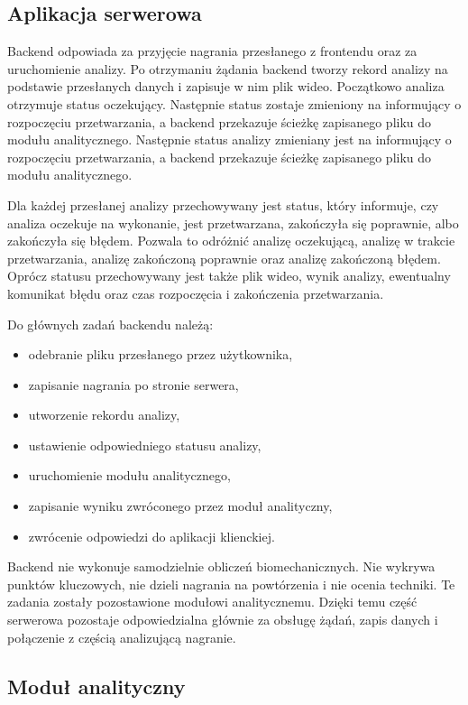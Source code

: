 \subsection{Aplikacja serwerowa}

Backend odpowiada za przyjęcie nagrania przesłanego z frontendu oraz za uruchomienie analizy. Po otrzymaniu żądania backend tworzy rekord analizy na podstawie przesłanych danych i zapisuje w nim plik wideo. Początkowo analiza otrzymuje status oczekujący. Następnie status zostaje zmieniony na informujący o rozpoczęciu przetwarzania, a backend przekazuje ścieżkę zapisanego pliku do modułu analitycznego. Następnie status analizy zmieniany jest na informujący o rozpoczęciu przetwarzania, a backend przekazuje ścieżkę zapisanego pliku do modułu analitycznego.

Dla każdej przesłanej analizy przechowywany jest status, który informuje, czy analiza oczekuje na wykonanie, jest przetwarzana, zakończyła się poprawnie, albo zakończyła się błędem. Pozwala to odróżnić analizę oczekującą, analizę w trakcie przetwarzania, analizę zakończoną poprawnie oraz analizę zakończoną błędem. Oprócz statusu przechowywany jest także plik wideo, wynik analizy, ewentualny komunikat błędu oraz czas rozpoczęcia i zakończenia przetwarzania.

Do głównych zadań backendu należą:

\begin{itemize}
\item odebranie pliku przesłanego przez użytkownika,
\item zapisanie nagrania po stronie serwera,
\item utworzenie rekordu analizy,
\item ustawienie odpowiedniego statusu analizy,
\item uruchomienie modułu analitycznego,
\item zapisanie wyniku zwróconego przez moduł analityczny,
\item zwrócenie odpowiedzi do aplikacji klienckiej.
\end{itemize}

Backend nie wykonuje samodzielnie obliczeń biomechanicznych. Nie wykrywa punktów kluczowych, nie dzieli nagrania na powtórzenia i nie ocenia techniki. Te zadania zostały pozostawione modułowi analitycznemu. Dzięki temu część serwerowa pozostaje odpowiedzialna głównie za obsługę żądań, zapis danych i połączenie z częścią analizującą nagranie.

\subsection{Moduł analityczny}

